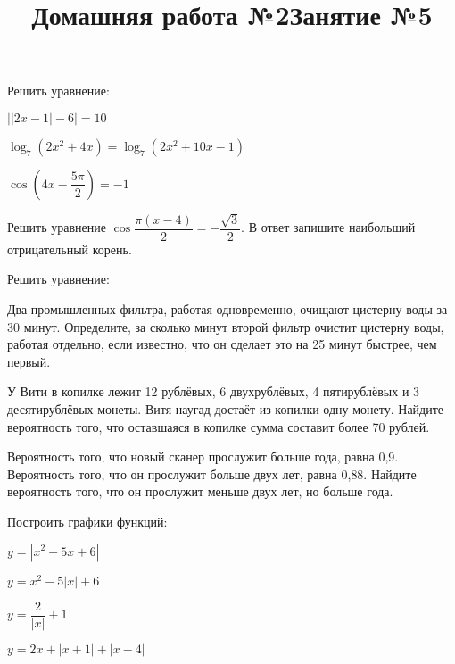 \newpage
\title{Домашняя работа №2}
\begin{listofex}
	\item Решить уравнение:
	\begin{enumcols}[itemcolumns=2]
		\item \( \big||2x - 1|-6\big|= 10 \)
		\item \(\log_7(2x^2+4x)=\log_7(2x^2+10x-1) \)
		\item {}
		\item \( \cos \left( 4x-\dfrac{5\pi}{2} \right) = -1 \)
	\end{enumcols}
	\item Решить уравнение \( \cos\dfrac{\pi(x-4)}{2}=-\dfrac{\sqrt{3}}{2} \). В ответ запишите наибольший отрицательный корень.
	\item {}
	\item Решить уравнение:
	\begin{enumcols}[itemcolumns=2]
		\item {}
		\item {}
	\end{enumcols}
	\item Два промышленных фильтра, работая одновременно, очищают цистерну воды за 30 минут.
	Определите, за сколько минут второй фильтр очистит цистерну воды, работая отдельно,
	если известно, что он сделает это на 25 минут быстрее, чем первый.
	\item У Вити в копилке лежит 12 рублёвых, 6 двухрублёвых, 4 пятирублёвых и 3 десятирублёвых монеты. Витя наугад достаёт из копилки одну монету. Найдите вероятность того, что оставшаяся в копилке сумма составит более 70 рублей.
	\item Вероятность того, что новый сканер прослужит больше года, равна 0,9. Вероятность того, что он прослужит больше двух лет, равна 0,88. Найдите вероятность того, что он прослужит меньше двух лет, но больше года.
\end{listofex}
\newpage
\title{Занятие №5}
\begin{listofex}
	\item {}
	\item {}
	\item {}
	\item {}
	\item {}
	\item {}
	\item {}
	\item {}
	\item {}
	\item {}
	\item {}
	\item Построить графики функций:
	\begin{enumcols}[itemcolumns=2]
		\item \( y=|x^2-5x+6| \)
		\item \( y=x^2-5|x|+6 \)
		\item \( y=\dfrac{2}{|x|}+1 \)
		\item \( y=2x+|x+1|+|x-4| \)
	\end{enumcols}
\end{listofex}
